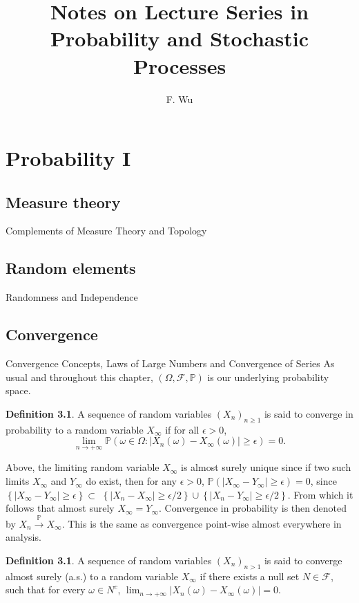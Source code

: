 \documentclass{amsbook}
\title{Notes on Lecture Series in Probability and Stochastic Processes }
\author{F. Wu}
\date{}
\theoremstyle{plain}%
\theoremstyle{definition}
\newtheorem{defn}[thm]{Definition}
\theoremstyle{remark}
\begin{document}
\maketitle
\tableofcontents
\part{Probability I}
\chapter{Measure theory}{Complements of Measure Theory and Topology}
\chapter{Random elements}{Randomness and Independence}
\chapter{Convergence}{Convergence Concepts, Laws of Large Numbers and Convergence of Series}
As usual and throughout this chapter, $(\Omega, \mathcal{F}, \mathbb{P})$ is our underlying probability space.
\begin{defn}
  A sequence of random variables $\left(X_{n}\right)_{n \geq 1}$ is said to converge in probability to a random variable $X_{\infty}$ if for all $\epsilon>0$,
  \[\lim _{n \rightarrow+\infty} \mathbb{P}\left(\omega \in \Omega:\left|X_{n}(\omega)-X_{\infty}(\omega)\right| \geq \epsilon\right)=0.\]
\end{defn}

Above, the limiting random variable $X_{\infty}$ is almost surely unique since if two such limits $X_{\infty}$ and $Y_{\infty}$ do exist, then for any $\epsilon>0$,
$\mathbb{P}\left(\left|X_{\infty}-Y_{\infty}\right| \geq \epsilon\right)=0$, since $\left\{\left|X_{\infty}-Y_{\infty}\right| \geq \epsilon\right\} \subset$ $\left\{\left|X_{n}-X_{\infty}\right| \geq \epsilon / 2\right\} \cup\left\{\left|X_{n}-Y_{\infty}\right| \geq \epsilon / 2\right\}$. From which it follows that almost surely $X_{\infty}=Y_{\infty}$. Convergence in probability is then denoted by $X_{n} \xrightarrow{\mathbb{P}} X_{\infty}$.
This is the same as convergence point-wise almost everywhere in analysis.

\begin{defn}
  A sequence of random variables $\left(X_{n}\right)_{n>1}$ is said to converge almost surely (a.s.) to a random variable $X_{\infty}$ if there exists a null set $N \in \mathcal{F}$, such that for every $\omega \in N^{c}$, $\lim _{n \rightarrow+\infty}\left|X_{n}(\omega)-X_{\infty}(\omega)\right|=0$.
\end{defn}
\end{document}
